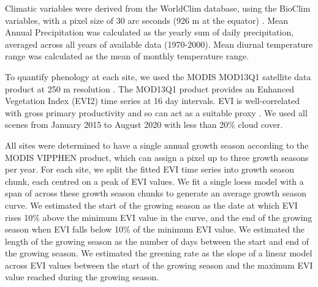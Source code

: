 \documentclass[11pt,a4paper]{article}
\begin{document}
Climatic variables were derived from the WorldClim database, using the BioClim variables, with a pixel size of 30 arc seconds (926 m at the equator) \citep{Fick2017}. Mean Annual Precipitation was calculated as the yearly sum of daily precipitation, averaged across all years of available data (1970-2000). Mean diurnal temperature range was calculated as the mean of monthly temperature range. 

To quantify phenology at each site, we used the MODIS MOD13Q1 satellite data product at 250 m resolution \citep{}. The MOD13Q1 product provides an Enhanced Vegetation Index (EVI2) time series at 16 day intervals. EVI is well-correlated with gross primary productivity and so can act as a suitable proxy \citep{}. We used all scenes from January 2015 to August 2020 with less than 20\% cloud cover.

All sites were determined to have a single annual growth season according to the MODIS VIPPHEN product, which can assign a pixel up to three growth seasons per year. For each site, we split the fitted EVI time series into growth season chunk, each centred on a peak of EVI values. We fit a single loess model with a span of \loessSpan{} across these growth season chunks to generate an average growth season curve. We estimated the start of the growing season as the date at which EVI rises 10\% above the minimum EVI value in the curve, and the end of the growing season when EVI falls below 10\% of the minimum EVI value. We estimated the length of the growing season as the number of days between the start and end of the growing season. We estimated the greening rate as the slope of a linear model across EVI values between the start of the growing season and the maximum EVI value reached during the growing season.
\end{document}
